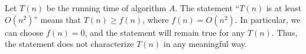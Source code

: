 Let $T(n)$ be the running time of algorithm $A$.
The statement ``$T(n)$ is at least $O(n^2)$'' means that $T(n)\ge f(n)$, where $f(n)=O(n^2)$.
In particular, we can choose $f(n)=0$, and the statement will remain true for any $T(n)$.
Thus, the statement does not characterize $T(n)$ in any meaningful way.
